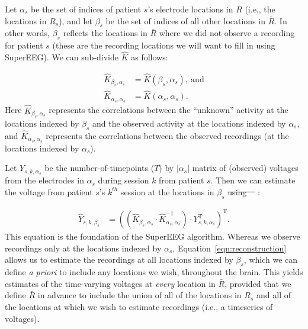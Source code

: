 \documentclass[10pt]{article}
\providecommand{\DIFaddtex}[1]{{\protect\color{blue}\uwave{#1}}} %
\providecommand{\DIFdeltex}[1]{{\protect\color{red}\sout{#1}}}                      %
\providecommand{\DIFaddbegin}{} %
\providecommand{\DIFaddend}{} %
\providecommand{\DIFdelbegin}{} %
\providecommand{\DIFdelend}{} %
\providecommand{\DIFadd}[1]{\texorpdfstring{\DIFaddtex{#1}}{#1}} %
\providecommand{\DIFdel}[1]{\texorpdfstring{\DIFdeltex{#1}}{}} %
\newcommand{\DIFscaledelfig}{0.5}
\newlength{\DIFdelgraphicswidth} %
\newlength{\DIFdelgraphicsheight} %
\newcommand{\DIFaddincludegraphics}[2][]{{\color{blue}\fbox{\DIFOincludegraphics[#1]{#2}}}} %
\newcommand{\DIFdelincludegraphics}[2][]{%
\sbox{\DIFdelgraphicsbox}{\DIFOincludegraphics[#1]{#2}}%
\settoboxwidth{\DIFdelgraphicswidth}{\DIFdelgraphicsbox} %
\settoboxtotalheight{\DIFdelgraphicsheight}{\DIFdelgraphicsbox} %
\scalebox{\DIFscaledelfig}{%
\parbox[b]{\DIFdelgraphicswidth}{\usebox{\DIFdelgraphicsbox}\\[-\baselineskip] \rule{\DIFdelgraphicswidth}{0em}}\llap{\resizebox{\DIFdelgraphicswidth}{\DIFdelgraphicsheight}{%
\setlength{\unitlength}{\DIFdelgraphicswidth}%
\begin{picture}(1,1)%
\thicklines\linethickness{2pt} %
{\color[rgb]{1,0,0}\put(0,0){\framebox(1,1){}}}%
{\color[rgb]{1,0,0}\put(0,0){\line( 1,1){1}}}%
{\color[rgb]{1,0,0}\put(0,1){\line(1,-1){1}}}%
\end{picture}%
}\hspace*{3pt}}} %
} %
\DeclareRobustCommand{\DIFaddbegin}{\DIFOaddbegin \let\includegraphics\DIFaddincludegraphics} %
\DeclareRobustCommand{\DIFaddend}{\DIFOaddend \let\includegraphics\DIFOincludegraphics} %
\DeclareRobustCommand{\DIFdelbegin}{\DIFOdelbegin \let\includegraphics\DIFdelincludegraphics} %
\DeclareRobustCommand{\DIFdelend}{\DIFOaddend \let\includegraphics\DIFOincludegraphics} %
\begin{document}
Let $\alpha_s$ be the set of indices of patient $s$'s electrode locations in
\DIFdelbegin \DIFdel{$\bar{R}$ }\DIFdelend \DIFaddbegin \DIFadd{$\overline{R}$ }\DIFaddend (i.e., the locations in $R_s$), and let $\beta_s$ be the set of
indices of all other locations in \DIFdelbegin \DIFdel{$\bar{R}$}\DIFdelend \DIFaddbegin \DIFadd{$\overline{R}$}\DIFaddend . In other words, $\beta_s$ reflects
the locations in \DIFdelbegin \DIFdel{$\bar{R}$ }\DIFdelend \DIFaddbegin \DIFadd{$\overline{R}$ }\DIFaddend where we did not observe a recording for patient $s$
(these are the recording locations we will want to fill in using SuperEEG). We
can sub-divide $\hat{K}$ as follows:

\begin{align}
\hat{K}_{\beta_s,\alpha_s} &= \hat{K}(\beta_s,\alpha_s),~\mathrm{and}\label{eqn:Kba}\\
\hat{K}_{\alpha_s,\alpha_s} &= \hat{K}(\alpha_s,\alpha_s)\label{eqn:Kaa}.
\end{align}
Here $\hat{K}_{\beta_s, \alpha_s}$ represents the correlations between
the ``unknown'' activity at the locations indexed by $\beta_s$ and the
observed activity at the locations indexed by $\alpha_s$, and
$\hat{K}_{\alpha_s, \alpha_s}$ represents the correlations between the
observed recordings (at the locations indexed by $\alpha_s$).

Let $Y_{s,k,\alpha_s}$ be the number-of-timepoints ($T$) by
$\left|\alpha_s\right|$ matrix of (observed) voltages from the electrodes in
$\alpha_s$ during session $k$ from patient $s$. Then we can estimate the voltage
from patient $s$'s $k^{th}$ session at the locations in $\beta_s$ \DIFdelbegin \DIFdel{using~\mbox{%
\cite{Rasm06}}\hspace{0pt}%
}\DIFdelend \DIFaddbegin \DIFadd{as
follows~\mbox{%
\citep{Rasm06}}\hspace{0pt}%
}\DIFaddend :

\begin{align}
\hat{Y}_{s,k,\beta_s} &= ((\hat{K}_{\beta_s,\alpha_s}\cdot\hat{K}_{\alpha_s,\alpha_s}^{-1})\cdot Y_{s,k,\alpha_s}^\mathrm{T})^\mathrm{T}.\label{eqn:reconstruction}
\end{align}
This equation is the foundation of the SuperEEG algorithm.  Whereas we
observe recordings only at the locations indexed by $\alpha_s$,
Equation~\ref{eqn:reconstruction} allows us to estimate the recordings
at all locations indexed by $\beta_s$, which we can define \textit{a priori}
to include any locations we wish, throughout the brain.  This yields
estimates of the time-varying voltages at \textit{every} location in
\DIFdelbegin \DIFdel{$\bar{R}$}\DIFdelend \DIFaddbegin \DIFadd{$\overline{R}$}\DIFaddend , provided that we define \DIFdelbegin \DIFdel{$\bar{R}$ }\DIFdelend \DIFaddbegin \DIFadd{$\overline{R}$ }\DIFaddend in advance to include the
union of all of the locations in $R_s$ and all of the locations
at which we wish to estimate recordings (i.e., a timeseries of
voltages).
\end{document}
